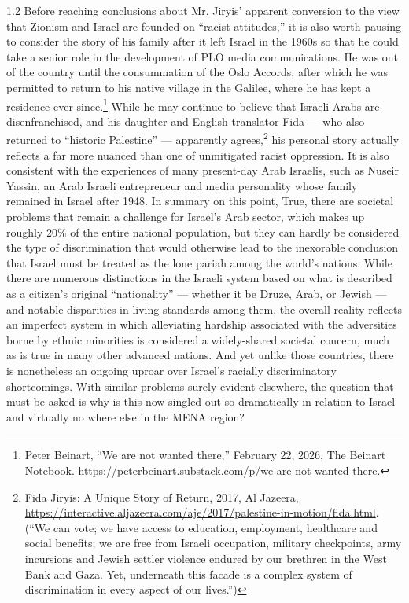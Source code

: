 \documentclass[../unravbook.tex]{subfiles}
\begin{document}
\begin{spacing}{1.2}
Before reaching conclusions about Mr. Jiryis' apparent conversion to the view that Zionism and Israel are founded on ``racist attitudes,'' it is also worth pausing to consider the story of his family after it left Israel in the 1960s so that he could take a senior role in the development of PLO media communications. He was out of the country until the consummation of the Oslo Accords, after which he was permitted to return to his native village in the Galilee, where he has kept a residence ever since.\footnote{Peter Beinart, ``We are not wanted there,'' February 22, 2026, The Beinart Notebook. \url{https://peterbeinart.substack.com/p/we-are-not-wanted-there}.} While he may continue to believe that Israeli Arabs are disenfranchised, and his daughter and English translator Fida --- who also returned to ``historic Palestine'' --- apparently agrees,\footnote{Fida Jiryis: A Unique Story of Return, 2017, Al Jazeera, \url{https://interactive.aljazeera.com/aje/2017/palestine-in-motion/fida.html}. (``We can vote; we have access to education, employment, healthcare and social benefits; we are free from Israeli occupation, military checkpoints, army incursions and Jewish settler violence endured by our brethren in the West Bank and Gaza. Yet, underneath this facade is a complex system of discrimination in every aspect of our lives.'')} his personal story actually reflects a far more nuanced than one of unmitigated racist oppression. It is also consistent with the experiences of many present-day Arab Israelis, such as Nuseir Yassin, an Arab Israeli entrepreneur and media personality whose family remained in Israel after 1948. In summary on this point, True, there are societal problems that remain a challenge for Israel's Arab sector, which makes up roughly 20\% of the entire national population, but they can hardly be considered the type of discrimination that would otherwise lead to the inexorable conclusion that Israel must be treated as the lone pariah among the world's nations. While there are numerous distinctions in the Israeli system based on what is described as a citizen's original ``nationality'' --- whether it be Druze, Arab, or Jewish --- and notable disparities in living standards among them, the overall reality reflects an imperfect system in which alleviating hardship associated with the adversities borne by ethnic minorities is considered a widely-shared societal concern, much as is true in many other advanced nations. And yet unlike those countries, there is nonetheless an ongoing uproar over Israel's racially discriminatory shortcomings. With similar problems surely evident elsewhere, the question that must be asked is why is this now singled out so dramatically in relation to Israel and virtually no where else in the MENA region? 


\end{spacing}
\end{document}
